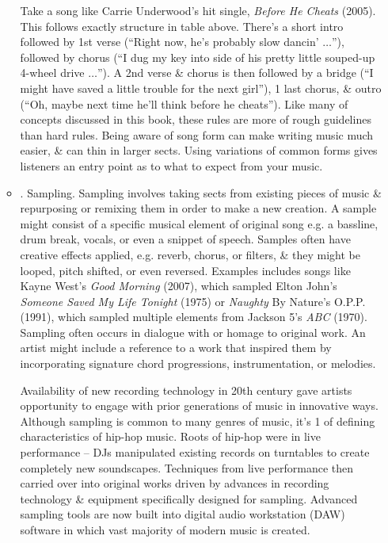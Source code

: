 \documentclass{article}
\begin{document}
\begin{itemize}
\begin{itemize}
		Take a song like {\sc Carrie Underwood}'s hit single, {\it Before He Cheats} (2005). This follows exactly structure in table above. There's a short intro followed by 1st verse (``Right now, he's probably slow dancin' $\ldots$''), followed by chorus (``I dug my key into side of his pretty little souped-up 4-wheel drive $\ldots$''). A 2nd verse \& chorus is then followed by a bridge (``I might have saved a little trouble for the next girl''), 1 last chorus, \& outro (``Oh, maybe next time he'll think before he cheats''). Like many of concepts discussed in this book, these rules are more of rough guidelines than hard rules. Being aware of song form can make writing music much easier, \& can thin in larger sects. Using variations of common forms gives listeners an entry point as to what to expect from your music.
		\item {. Sampling.} Sampling involves taking sects from existing pieces of music \& repurposing or remixing them in order to make a new creation. A sample might consist of a specific musical element of original song e.g. a bassline, drum break, vocals, or even a snippet of speech. Samples often have creative effects applied, e.g. reverb, chorus, or filters, \& they might be looped, pitch shifted, or even reversed. Examples includes songs like {\sc Kayne West}'s {\it Good Morning} (2007), which sampled {\sc Elton John}'s {\it Someone Saved My Life Tonight} (1975) or {\it Naughty} By Nature's O.P.P. (1991), which sampled multiple elements from Jackson 5's {\it ABC} (1970). Sampling often occurs in dialogue with or homage to original work. An artist might include a reference to a work that inspired them by incorporating signature chord progressions, instrumentation, or melodies.
		
		Availability of new recording technology in 20th century gave artists opportunity to engage with prior generations of music in innovative ways. Although sampling is common to many genres of music, it's 1 of defining characteristics of hip-hop music. Roots of hip-hop were in live performance -- DJs manipulated existing records on turntables to create completely new soundscapes. Techniques from live performance then carried over into original works driven by advances in recording technology \& equipment specifically designed for sampling. Advanced sampling tools are now built into digital audio workstation (DAW) software in which vast majority of modern music is created.
		

\end{itemize}
\end{itemize}
\end{document}
